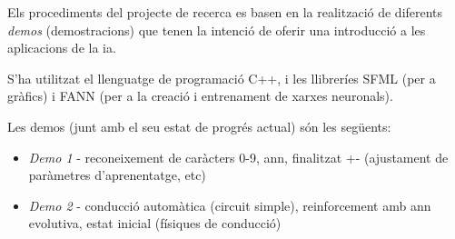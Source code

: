 Els procediments del projecte de recerca es basen en la realització de diferents \emph{demos} (demostracions)
que tenen la intenció de oferir una introducció a les aplicacions de la \ac{ia}.

S'ha utilitzat el llenguatge de programació C++, i les llibreríes SFML \autocite{sfmllib} (per a gràfics) i FANN \cite{fannlib} (per a la
creació i entrenament de xarxes neuronals).

Les demos (junt amb el seu estat de progrés actual) són les següents:

\begin{itemize}
\item \emph{Demo 1} - reconeixement de caràcters 0-9, \ac{ann}, finalitzat +- (ajustament de paràmetres d'aprenentatge, etc)
\item \emph{Demo 2} - conducció automàtica (circuit simple), reinforcement amb \ac{ann} evolutiva, estat inicial (físiques de conducció)
\end{itemize}
